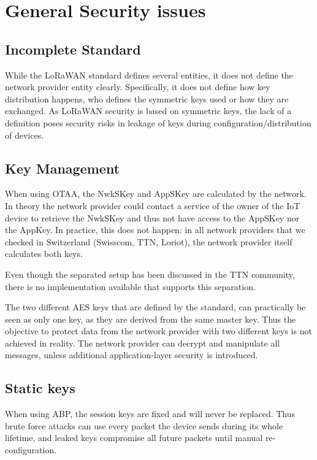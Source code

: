 \chapter{General Security issues}

\section{Incomplete Standard}

{While the LoRaWAN standard defines several entities, it does not define
the network provider entity clearly. Specifically, it does not define
how key distribution happens, who defines the symmetric keys used or how
they are exchanged. As LoRaWAN security is based on symmetric keys, the
lack of a definition poses security risks in leakage of keys during
configuration/distribution of devices.}

\section{Key Management}

{When using OTAA, the NwkSKey and AppSKey are calculated by the network.
In theory the network provider could contact a service of the owner of
the IoT device to retrieve the NwkSKey and thus not have access to the
AppSKey nor the AppKey. In practice, this does not happen: in all
network providers that we checked in Switzerland (Swisscom, TTN,
Loriot), the network provider itself calculates both keys.}

{Even though the separated setup has been discussed in the TTN
community, there is no implementation available that supports this
separation.}

{The two different AES keys that are defined by the standard, can
practically be seen as only one key, as they are derived from the same
master key. Thus the objective to protect data from the network provider
with two different keys is not achieved in reality. The network provider
can decrypt and manipulate all messages, unless additional
application-layer security is introduced.}

\section{\texorpdfstring{{Static
keys}}{Static keys}}\label{h.1g22hul9yfrw}

{When using ABP, the session keys are fixed and will never be replaced.
Thus brute force attacks can use every packet the device sends during
its whole lifetime, and leaked keys compromise all future packets until
manual re-configuration.}

